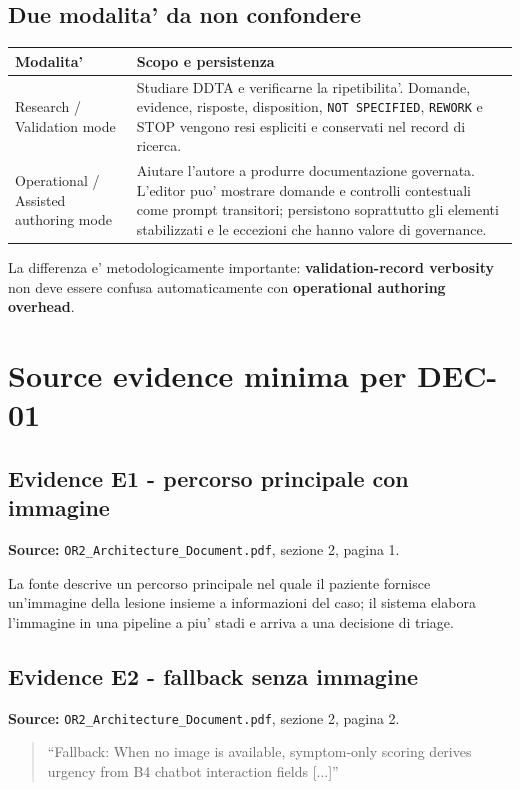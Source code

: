 \documentclass[11pt,a4paper]{article}
\begin{document}
\subsection{Due modalita' da non confondere}
\begin{tabularx}{\textwidth}{L{43mm}Y}
\toprule
\textbf{Modalita'} & \textbf{Scopo e persistenza} \\
\midrule
Research / Validation mode & Studiare DDTA e verificarne la ripetibilita'. Domande, evidence, risposte, disposition, \texttt{NOT SPECIFIED}, \texttt{REWORK} e STOP vengono resi espliciti e conservati nel record di ricerca. \\
Operational / Assisted authoring mode & Aiutare l'autore a produrre documentazione governata. L'editor puo' mostrare domande e controlli contestuali come prompt transitori; persistono soprattutto gli elementi stabilizzati e le eccezioni che hanno valore di governance. \\
\bottomrule
\end{tabularx}

La differenza e' metodologicamente importante: \textbf{validation-record verbosity} non deve essere confusa automaticamente con \textbf{operational authoring overhead}.

\section{Source evidence minima per DEC-01}

\subsection{Evidence E1 - percorso principale con immagine}
\textbf{Source:} \texttt{OR2\_Architecture\_Document.pdf}, sezione 2, pagina 1.

La fonte descrive un percorso principale nel quale il paziente fornisce un'immagine della lesione insieme a informazioni del caso; il sistema elabora l'immagine in una pipeline a piu' stadi e arriva a una decisione di triage.

\subsection{Evidence E2 - fallback senza immagine}
\textbf{Source:} \texttt{OR2\_Architecture\_Document.pdf}, sezione 2, pagina 2.

\begin{quote}
\small ``Fallback: When no image is available, symptom-only scoring derives urgency from B4 chatbot interaction fields [...]''
\end{quote}
\end{document}
